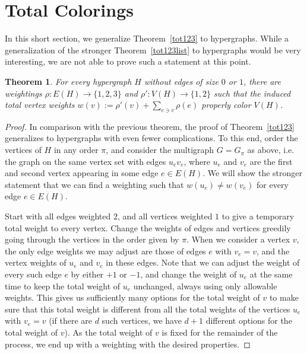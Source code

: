 \documentclass[reqno,12pt,epsf]{amsart}
\newtheorem{theorem}{Theorem}     %
\def\omm{\rho}
\begin{document}
\section{Total Colorings}\label{total}
In this short section, we generalize Theorem~\ref{tot123}  %
to hypergraphs. While a generalization of the stronger Theorem~\ref{tot123list} to hypergraphs would be very interesting, we are not able to prove such a statement at this point.

\begin{theorem}
For every hypergraph $H$ without edges of size $0$ or $1$, there are weightings $\omm: E(H)\to \{1,2,3\}$ and $\omm': V(H)\to \{1,2\}$
such that the induced total vertex weights $w(v):=\omm'(v)+\sum_{e\ni v}\omm(e)$ properly color $V(H)$.
\end{theorem}

\begin{proof}
In comparison with the previous theorem, the proof of Theorem~\ref{tot123} generalizes to hypergraphs with even fewer complications. To this end, order the vertices of $H$ in any order $\pi$, and consider the multigraph $G=G_{\pi}$ as above, i.e. the graph on the same vertex set with edges $u_ev_e$, where $u_e$ and $v_e$ are the first and second vertex appearing in some edge $e\in E(H)$. We will show the stronger statement that we can find a weighting such that $w(u_e)\ne w(v_e)$ for every edge $e\in E(H)$.

Start with all edges weighted $2$, and all vertices weighted $1$ to give a temporary total weight to every vertex.
Change the weights of edges and vertices greedily going through the vertices in the order given by $\pi$. When we consider a vertex $v$, the only edge weights we may adjust are those of edges $e$ with $v_e=v$, and the vertex weights of $u_e$ and $v_e$ in these edges.
Note that we can adjust the weight of every such edge $e$ by either $+1$ or $-1$, and change the weight of $u_e$ at the same time to keep the total weight of $u_e$ unchanged, always using only allowable weights.
This gives us sufficiently many options for the total weight of $v$ to make sure that this total weight is different from all the total weights of  the vertices $u_e$ with $v_e=v$ (if there are $d$ such vertices, we have $d+1$ different options for the total weight of $v$).
As the total weight of $v$ is fixed for the remainder of the process, we end up with a weighting with the desired properties.
\end{proof}
\end{document}
